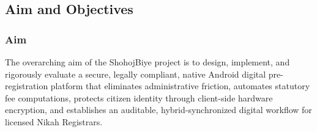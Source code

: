 \documentclass[12pt,a4paper]{article}
\begin{document}
	\subsection{Aim and Objectives}
	
	\subsubsection{Aim}
	The overarching aim of the ShohojBiye project is to design, implement, and rigorously evaluate a secure, legally compliant, native Android digital pre-registration platform that eliminates administrative friction, automates statutory fee computations, protects citizen identity through client-side hardware encryption, and establishes an auditable, hybrid-synchronized digital workflow for licensed Nikah Registrars.
	
\end{document}
